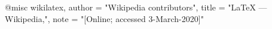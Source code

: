 @misc{ wikilatex,
	author = "{Wikipedia contributors}",
	title = "LaTeX --- {Wikipedia}{,}",
	note = "[Online; accessed 3-March-2020]"
}
